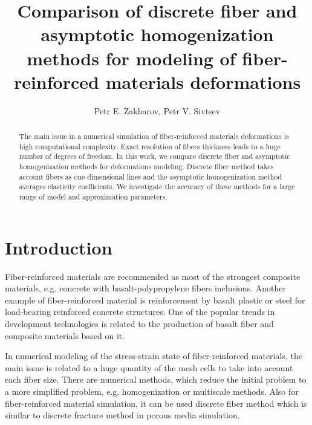 \documentclass[a4paper]{jpconf}
\begin{document}
\title{Comparison of discrete fiber and asymptotic homogenization methods for modeling of fiber-reinforced materials deformations}
\author{Petr E. Zakharov, Petr V. Sivtsev}
\address{Ammosov North-Eastern Federal University, 58, Belinskogo, 677000 Yakutsk, Russia}




\begin{abstract}
 
The main issue in a numerical simulation of fiber-reinforced materials deformations is high computational complexity.
Exact resolution of fibers thickness leads to a huge number of degrees of freedom. In this work, we compare discrete fiber and asymptotic homogenization methods for deformations modeling.
Discrete fiber method takes account fibers as one-dimensional lines and the asymptotic homogenization method averages elasticity coefficients.
We investigate the accuracy of these methods for a large range of model and approximation parameters.
\end{abstract}


\section{Introduction}

Fiber-reinforced materials are recommended as most of the strongest composite materials, e.g. concrete with basalt-polypropylene fibers inclusions\cite{smarzewski2019influence}.
Another example of fiber-reinforced material is reinforcement by basalt plastic or steel for load-bearing reinforced concrete structures\cite{savspv2018,Kolesov}.
One of the popular trends in development technologies is related to the production of basalt fiber and composite materials based on it.

In numerical modeling of the stress-strain state of fiber-reinforced materials, the main issue is related to a huge quantity of the mesh cells to take into account each fiber size.
There are numerical methods, which reduce the initial problem to a more simplified problem, e.g. homogenization or multiscale methods\cite{Zakharov, stepanov2018generalized}. Also for fiber-reinforced material simulation, it can be used discrete fiber method which is similar to discrete fracture method\cite{DFM, DFM2} in porous media simulation.
\end{document}
